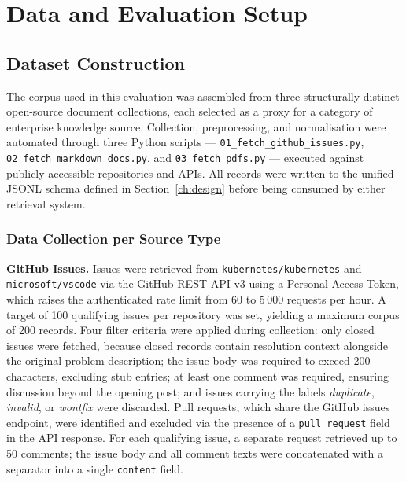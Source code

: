 
\chapter{Data and Evaluation Setup}
\label{ch:data}

\section{Dataset Construction}
\label{sec:dataset}

The corpus used in this evaluation was assembled from three structurally distinct open-source document collections, each selected as a proxy for a category of enterprise knowledge source. Collection, preprocessing, and normalisation were automated through three Python scripts — \texttt{01\_fetch\_github\_issues.py}, \texttt{02\_fetch\_markdown\_docs.py}, and \texttt{03\_fetch\_pdfs.py} — executed against publicly accessible repositories and APIs. All records were written to the unified JSONL schema defined in Section~\ref{ch:design} before being consumed by either retrieval system.

\subsection{Data Collection per Source Type}

\textbf{GitHub Issues.} Issues were retrieved from \texttt{kubernetes/kubernetes} and \texttt{microsoft/vscode} via the GitHub REST API v3 using a Personal Access Token, which raises the authenticated rate limit from 60 to 5\,000 requests per hour. A target of 100 qualifying issues per repository was set, yielding a maximum corpus of 200 records. Four filter criteria were applied during collection: only closed issues were fetched, because closed records contain resolution context alongside the original problem description; the issue body was required to exceed 200 characters, excluding stub entries; at least one comment was required, ensuring discussion beyond the opening post; and issues carrying the labels \textit{duplicate}, \textit{invalid}, or \textit{wontfix} were discarded. Pull requests, which share the GitHub issues endpoint, were identified and excluded via the presence of a \texttt{pull\_request} field in the API response. For each qualifying issue, a separate request retrieved up to 50 comments; the issue body and all comment texts were concatenated with a separator into a single \texttt{content} field.

